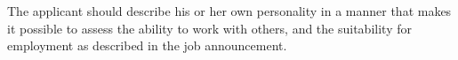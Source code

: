 \documentclass[12pt]{article}
\begin{document}
\begin{center}
{\Large{}}
\end{center}

The applicant should describe his or her own personality in a manner
that makes it possible to assess the ability to work with others, and
the suitability for employment as described in the job announcement.
\end{document}
